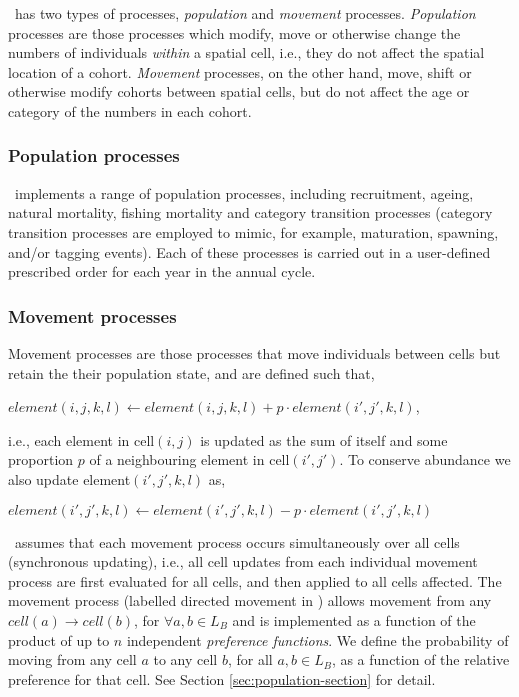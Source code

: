 
\SPM\  has two types of processes, \emph{population} and \emph{movement} processes. \emph{Population} processes are those processes which modify, move or otherwise change the numbers of individuals \emph{within} a spatial cell, i.e., they do not affect the spatial location of a cohort. \emph{Movement} processes, on the other hand, move, shift or otherwise modify cohorts between spatial cells, but do not affect the age or category of the numbers in each cohort. 

\subsubsection*{Population processes}

\SPM\ implements a range of population processes, including recruitment, ageing, natural mortality, fishing mortality and category transition processes (category transition processes are employed to mimic, for example, maturation, spawning, and/or tagging events). Each of these processes is carried out in a user-defined prescribed order for each year in the annual cycle.  

\subsubsection*{Movement processes}

Movement processes are those processes that move individuals between cells but retain the their population state, and are defined such that,

$element(i,j,k,l)\leftarrow element(i,j,k,l) + p \cdot element(i',j',k,l)$,

i.e., each element in cell$(i,j)$ is updated as the sum of itself and some proportion $p$ of a neighbouring element in cell$(i',j')$. To conserve abundance we also update element$(i',j',k,l)$ as,

$element(i',j',k,l)\leftarrow element(i',j',k,l) - p\cdot element(i',j',k,l)$

\SPM\ assumes that each movement process occurs simultaneously over all cells (synchronous updating), i.e., all cell updates from each individual movement process are first evaluated for all cells, and then applied to all cells affected. The movement process (labelled directed movement in \SPM) allows movement from any $cell(a) \rightarrow cell(b)$, for $\forall a,b \in L_B$ and is implemented as a function of the product of up to $n$ independent \emph{preference functions}. We define the probability of moving from any cell $a$ to any cell $b$, for all $a,b \in L_B$, as a function of the relative preference for that cell. See Section \ref{sec:population-section} for detail.

